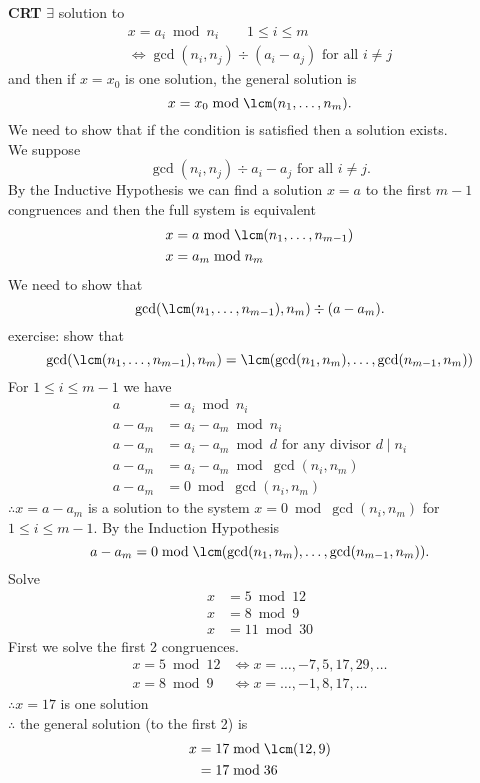 \textbf{CRT} $\exists$ solution to
\begin{align*}
x = a_i \bmod n_i \qquad 1\leq i\leq m \\
\iff \gcd(n_i,n_j)\div(a_i-a_j) \text{ for all $i\neq j$}
\end{align*}
and then if $x=x_0$ is one solution, the general solution is
\[ x = x_0 \bmod \lcm(n_1,\dotsc,n_m) . \]
We need to show that if the condition is satisfied then a solution exists. \\
We suppose
\[ \gcd(n_i,n_j)\div a_i-a_j \text{ for all $i\neq j$} . \]
By the Inductive Hypothesis we can find a solution $x=a$ to the first $m-1$ congruences and then the full system is equivalent
\begin{align*}
x &= a \bmod \lcm(n_1,\dotsc,n_{m-1}) \\
x &= a_m \bmod n_m
\end{align*}
We need to show that
\[ \gcd(\lcm(n_1,\dotsc,n_{m-1}),n_m)\div(a-a_m) . \]
exercise: show that
\[ \gcd(\lcm(n_1,\dotsc,n_{m-1}),n_m) = \lcm(\gcd(n_1,n_m),\dotsc,\gcd(n_{m-1},n_m)) \]
For $1\leq i\leq m-1$ we have
\begin{align*}
a &= a_i \bmod n_i \\
a-a_m &= a_i-a_m \bmod n_i \\
a-a_m &= a_i-a_m \bmod d \text{ for any divisor $d\mid n_i$} \\
a-a_m &= a_i-a_m \bmod \gcd(n_i,n_m) \\
a-a_m &= 0 \bmod \gcd(n_i,n_m)
\end{align*}
$\therefore x=a-a_m$ is a solution to the system $x=0\bmod\gcd(n_i,n_m)$ for $1\leq i\leq m-1$.  By the Induction Hypothesis
\[ a - a_m = 0 \bmod \lcm(\gcd(n_1,n_m),\dotsc,\gcd(n_{m-1},n_m)) . \]
\eg Solve
\begin{align*}
x &= 5 \bmod 12 \\
x &= 8 \bmod 9 \\
x &= 11 \bmod 30
\end{align*}
\soln First we solve the first 2 congruences.
\begin{align*}
x = 5 \bmod 12 &\iff x = \dotsc, -7, 5, 17, 29, \dotsc \\
x = 8 \bmod 9 &\iff x = \dotsc, -1, 8, 17, \dotsc
\end{align*}
$\therefore x=17$ is one solution \\
$\therefore$ the general solution (to the first 2) is
\begin{align*}
x &= 17 \bmod \lcm(12,9) \\
&= 17 \bmod 36
\end{align*}
